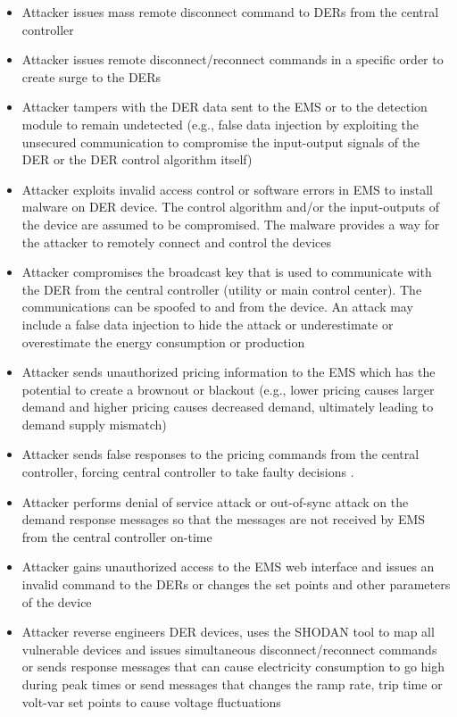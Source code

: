 \documentclass[conference]{IEEEtran}
\begin{document}
\begin{itemize}
 \item Attacker issues mass remote disconnect command to DERs from the central controller 
  \item Attacker issues remote disconnect/reconnect commands in a specific order to create surge to the DERs 
 \item Attacker tampers with the DER data sent to the EMS or to the detection module to remain undetected (e.g., false data injection by exploiting the unsecured communication to compromise the input-output signals of the DER or the DER control algorithm itself)
 \item Attacker exploits invalid access control or software errors in EMS to install malware on DER device. The control algorithm and/or the input-outputs of the device are assumed to be compromised. The malware provides a way for the attacker to  remotely connect and control the devices 
 \item Attacker compromises the broadcast key that is used to communicate with the DER from the central controller (utility or main control center). The communications can be spoofed to and from the device. An attack may include a false data injection to hide the attack or underestimate or overestimate the energy consumption or production 
 \item Attacker sends unauthorized pricing information to the EMS which has the potential to create a brownout or blackout (e.g., lower pricing causes larger demand and higher pricing causes decreased demand, ultimately leading to demand supply mismatch) 
  \item Attacker sends false responses to the pricing commands from the central controller,  forcing central controller to take faulty decisions . 
 \item Attacker performs denial of service attack or out-of-sync attack on the demand response messages so that the messages are not received by EMS from the central controller on-time  
 \item Attacker gains unauthorized access to the EMS web interface and issues an invalid command to the DERs or changes the set points and other parameters of the device 
 \item Attacker reverse engineers DER devices, uses the SHODAN tool to map all vulnerable devices and issues simultaneous disconnect/reconnect commands or sends response messages that can cause electricity consumption to go high during peak times or send messages that changes the ramp rate, trip time or volt-var set points to cause voltage fluctuations 

\end{itemize}
\end{document}
